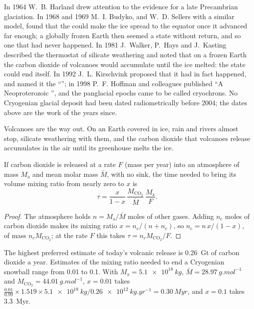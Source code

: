 \begin{history}
In 1964 W.~B. Harland drew attention to the evidence for a late Precambrian glaciation. In
1968 and 1969 M.~I. Budyko, and W.~D. Sellers with a similar model, found that the
 could make the ice spread to the equator once it advanced far enough; a
globally frozen Earth then seemed a state without return, and so one that had never happened.
In 1981 J.~Walker, P.~Hays and J.~Kasting described the thermostat of silicate weathering and
noted that on a frozen Earth the carbon dioxide of volcanoes would accumulate until the ice
melted: the state could end itself. In 1992 J.~L. Kirschvink proposed that it had in fact
happened, and named it the ``''; in 1998 P.~F. Hoffman and colleagues published
``A Neoproterozoic '', and the panglacial epochs came to be called cryochrons. No
Cryogenian glacial deposit had been dated radiometrically before 2004; the dates above are the
work of the years since.
\end{history}

Volcanoes are the way out. On an Earth covered in ice, rain and rivers almost stop, silicate
weathering with them, and the carbon dioxide that volcanoes release accumulates in the air
until its greenhouse melts the ice.

\begin{proposition}\label{prop:b2:precambrian-earth:co2}
If carbon dioxide is released at a rate $F$ (mass per year) into an atmosphere of mass
$M_{\text{a}}$ and mean molar mass $\bar M$, with no sink, the time needed to bring its volume
mixing ratio from nearly zero to $x$ is
\[
  \tau = \frac{x}{1 - x}\,\frac{M_{\mathrm{CO_2}}}{\bar M}\,\frac{M_{\text{a}}}{F} .
\]
\end{proposition}

\begin{proof}
The atmosphere holds $n = M_{\text{a}}/\bar M$ moles of other gases. Adding $n_c$ moles of
carbon dioxide makes its mixing ratio $x = n_c/(n + n_c)$, so $n_c = n\,x/(1 - x)$, of mass
$n_c M_{\mathrm{CO_2}}$; at the rate $F$ this takes $\tau = n_c M_{\mathrm{CO_2}}/F$.
\end{proof}

\begin{example}\label{ex:b2:precambrian-earth:escape}
The highest preferred estimate of today's volcanic release is \qty{0.26}{Gt} of carbon
dioxide a year. Estimates of the
mixing ratio needed to end a Cryogenian snowball range from 0.01 to 0.1. With $M_{\text{a}} =
\qty{5.1e18}{kg}$, $\bar M = \qty{28.97}{g.mol^{-1}}$ and $M_{\mathrm{CO_2}} =
\qty{44.01}{g.mol^{-1}}$, $x = 0.01$ takes $\frac{0.01}{0.99}\times1.519\times\qty{5.1e18}{kg}
/ \qty{0.26e12}{kg.yr^{-1}} = \qty{0.30}{Myr}$, and $x = 0.1$ takes \qty{3.3}{Myr}.
\end{example}

